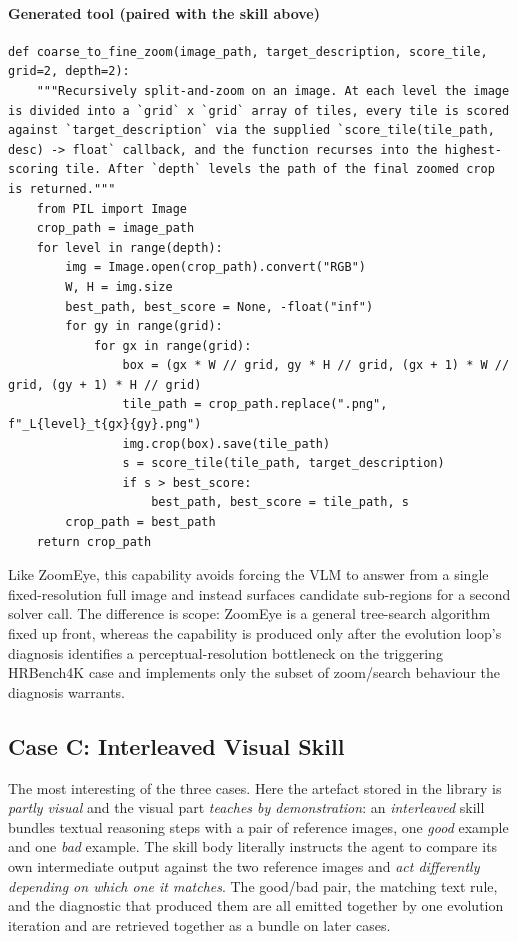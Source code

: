 \paragraph{Generated tool (paired with the skill above)}
\begin{lstlisting}[style=pycode]
def coarse_to_fine_zoom(image_path, target_description, score_tile, grid=2, depth=2):
    """Recursively split-and-zoom on an image. At each level the image is divided into a `grid` x `grid` array of tiles, every tile is scored against `target_description` via the supplied `score_tile(tile_path, desc) -> float` callback, and the function recurses into the highest-scoring tile. After `depth` levels the path of the final zoomed crop is returned."""
    from PIL import Image
    crop_path = image_path
    for level in range(depth):
        img = Image.open(crop_path).convert("RGB")
        W, H = img.size
        best_path, best_score = None, -float("inf")
        for gy in range(grid):
            for gx in range(grid):
                box = (gx * W // grid, gy * H // grid, (gx + 1) * W // grid, (gy + 1) * H // grid)
                tile_path = crop_path.replace(".png", f"_L{level}_t{gx}{gy}.png")
                img.crop(box).save(tile_path)
                s = score_tile(tile_path, target_description)
                if s > best_score:
                    best_path, best_score = tile_path, s
        crop_path = best_path
    return crop_path
\end{lstlisting}

Like ZoomEye, this capability avoids forcing the VLM to answer from a single
fixed-resolution full image and instead surfaces candidate sub-regions for a second
solver call. The difference is scope: ZoomEye is a general tree-search algorithm fixed
up front, whereas the \sysname{} capability is produced only after the evolution loop's
diagnosis identifies a perceptual-resolution bottleneck on the triggering HRBench4K case
and implements only the subset of zoom/search behaviour the diagnosis warrants.

\subsection{Case C: Interleaved Visual Skill}
\label{app:interleaved_visual_skills}

The most interesting of the three cases. Here the artefact stored in the library is
\emph{partly visual} and the visual part \emph{teaches by demonstration}: an
\emph{interleaved} skill bundles textual reasoning steps with a pair of reference images,
one \emph{good} example and one \emph{bad} example. The skill body literally instructs
the agent to compare its own intermediate output against the two reference images and
\emph{act differently depending on which one it matches}. The good/bad pair, the
matching text rule, and the diagnostic that produced them are all emitted together by
one evolution iteration and are retrieved together as a bundle on later cases.

